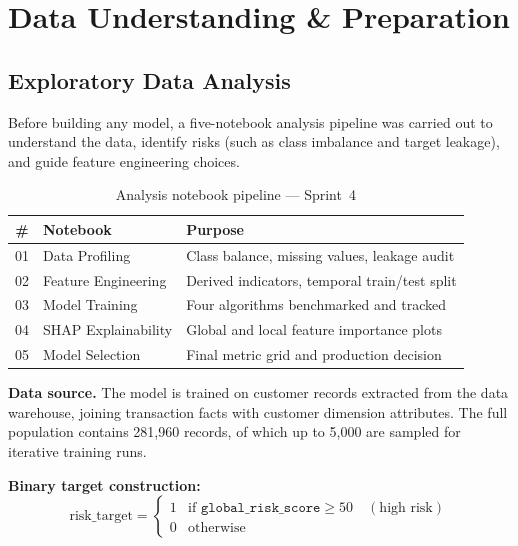 \section{Data Understanding \& Preparation}
\label{sec:phase2_data}

\subsection{Exploratory Data Analysis}

Before building any model, a five-notebook analysis pipeline was carried out
to understand the data, identify risks (such as class imbalance and target
leakage), and guide feature engineering choices.

\begin{table}[H]
\centering
\caption{Analysis notebook pipeline --- Sprint~4}
\label{tab:notebook-pipeline}
\begin{tabular}{|c|p{4cm}|p{7cm}|}
\hline
\textbf{\#} & \textbf{Notebook} & \textbf{Purpose} \\
\hline
01 & Data Profiling & Class balance, missing values, leakage audit \\
02 & Feature Engineering & Derived indicators, temporal train/test split \\
03 & Model Training & Four algorithms benchmarked and tracked \\
04 & SHAP Explainability & Global and local feature importance plots \\
05 & Model Selection & Final metric grid and production decision \\
\hline
\end{tabular}
\end{table}

\textbf{Data source.} The model is trained on customer records extracted from
the data warehouse, joining transaction facts with customer dimension attributes.
The full population contains 281{,}960 records, of which up to 5{,}000 are
sampled for iterative training runs.

\textbf{Binary target construction:}
\begin{equation}
\text{risk\_target} =
\begin{cases}
1 & \text{if } \texttt{global\_risk\_score} \geq 50 \quad (\text{high risk}) \\
0 & \text{otherwise}
\end{cases}
\label{eq:risk-target}
\end{equation}

